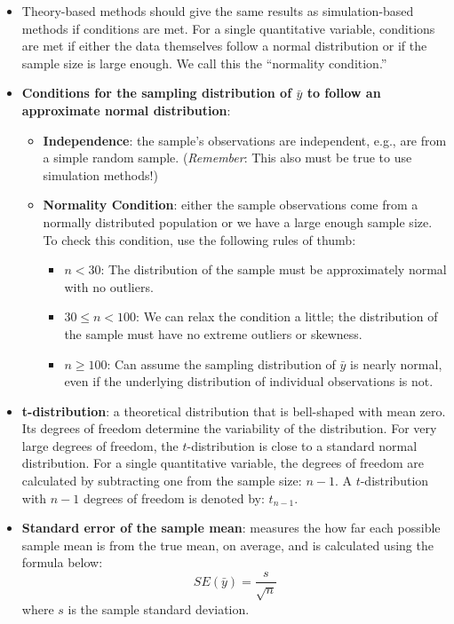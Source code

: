 \documentclass[
]{report}
\begin{document}
\begin{itemize}
\item
  Theory-based methods should give the same results as simulation-based methods if conditions are met. For a single quantitative variable, conditions are met if either the data themselves follow a normal distribution or if the sample size is large enough. We call this the ``normality condition.''
\item
  \textbf{Conditions for the sampling distribution of \(\bar{y}\) to follow an approximate normal distribution}:

  \begin{itemize}
  \item
    \textbf{Independence}: the sample's observations are independent, e.g., are from a simple random sample. (\emph{Remember}: This also must be true to use simulation methods!)
  \item
    \textbf{Normality Condition}: either the sample observations come from a normally distributed population or we have a large enough sample size. To check this condition, use the following rules of thumb:

    \begin{itemize}
    \item
      \(n < 30\): The distribution of the sample must be approximately normal with no outliers.
    \item
      \(30 \le n < 100\): We can relax the condition a little; the distribution of the sample must have no extreme outliers or skewness.
    \item
      \(n \ge 100\): Can assume the sampling distribution of \(\bar{y}\) is nearly normal, even if the underlying distribution of individual observations is not.
    \end{itemize}
  \end{itemize}
\item
  \textbf{t-distribution}: a theoretical distribution that is bell-shaped with mean zero. Its degrees of freedom determine the variability of the distribution. For very large degrees of freedom, the \(t\)-distribution is close to a standard normal distribution. For a single quantitative variable, the degrees of freedom are calculated by subtracting one from the sample size: \(n-1\). A \(t\)-distribution with \(n-1\) degrees of freedom is denoted by: \(t_{n-1}\).
\item
  \textbf{Standard error of the sample mean}: measures the how far each possible sample mean is from the true mean, on average, and is calculated using the formula below:
  \[SE(\bar{y})=\frac{s}{\sqrt{n}}\]
  where \(s\) is the sample standard deviation.


\end{itemize}
\end{document}
